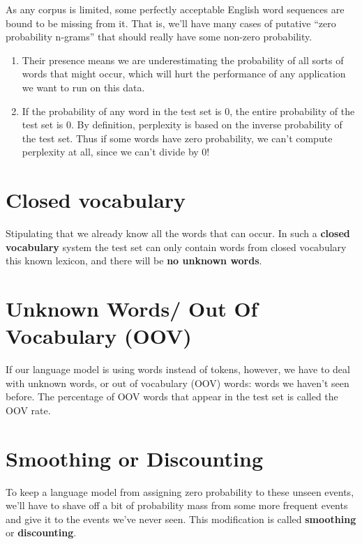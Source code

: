 As any corpus is limited, some perfectly acceptable English word sequences are bound to be missing from it. That is, we’ll have many cases of putative “zero probability n-grams” that should really have some non-zero probability.

\begin{enumerate}
    \item Their presence means we are underestimating the probability of all sorts of words that might occur, which will hurt the performance of any application we want to run on this data.
    \item If the probability of any word in the test set is 0, the entire probability of the test set is 0. By definition, perplexity is based on the inverse probability of the test set. Thus if some words have zero probability, we can’t compute perplexity at all, since we can’t divide by 0!
\end{enumerate}


\section{Closed vocabulary \cite{nlp-1}}

Stipulating that we already know all the words that can occur. In such a \textbf{closed vocabulary} system the test set can only contain words from closed vocabulary this known lexicon, and there will be \textbf{no unknown words}.


\section{Unknown Words/ Out Of Vocabulary (OOV) \cite{nlp-1}}

If our language model is using words instead of tokens, however, we have to deal with unknown words, or out of vocabulary (OOV) words: words we haven’t seen before. The percentage of OOV words that appear in the test set is called the OOV rate.


\section{Smoothing or Discounting \cite{nlp-1}}

To keep a language model from assigning zero probability to these unseen events, we’ll have to shave off a bit of probability mass from some more frequent events and give it to the events we’ve never seen. This modification is called \textbf{smoothing} or \textbf{discounting}.

